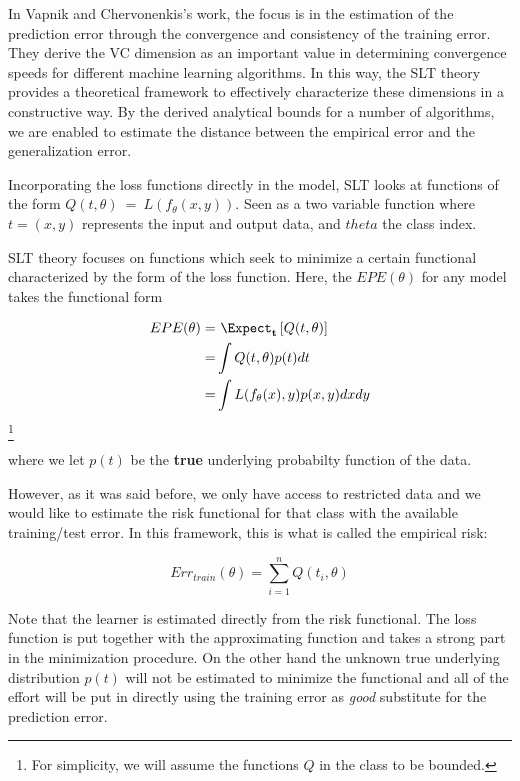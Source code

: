 In Vapnik and Chervonenkis's work, the focus is in the estimation of the prediction error through the convergence and consistency of the training error. They derive the VC dimension as an important value in determining convergence speeds for different machine learning algorithms. In this way, the SLT theory provides a theoretical framework to effectively characterize these dimensions in a constructive way. By the derived analytical bounds for a number of algorithms, we are enabled to estimate the distance between the empirical error and the generalization error.

Incorporating the loss functions directly in the model, SLT looks at functions of the form $Q(t,\theta) \ = \ L(f_\theta(x,y))$. Seen as a two variable function where $t=(x,y)$ represents the input and output data, and $theta$ the class index. 

SLT theory focuses on functions which seek to minimize a certain functional characterized by the form of the loss function. Here, the $EPE(\theta)$ for any model takes the functional form 

\begin{equation}\label{vapnik-risk}
\begin{split}
EPE(\theta) = & \ \Expect_{\textbf{t}} \left[  Q(t,\theta) \right]\\
= & \int Q(t,\theta) p(t) dt  \\
= & \int L(f_\theta(x),y) p(x,y) dx dy 
\end{split}
\end{equation}\footnote{For simplicity, we will assume the functions $Q$ in the class to be bounded.}

where we let $p(t)$ be the \textbf{true} underlying probabilty function of the data. 

However, as it was said before, we only have access to restricted data and we would like to estimate the risk functional for that class with the available training/test error. In this framework, this is what is called the empirical risk:

\begin{equation}\label{vapnik-empiricalRisk}
Err_{train}(\theta) =  \sum_{i=1}^n Q(t_i,\theta) 
\end{equation}

Note that the learner is estimated directly from the risk functional. The loss function is put together with the approximating function and takes a strong part in the minimization procedure. On the other hand the unknown true underlying distribution $p(t)$ will not be estimated to minimize the functional and all of the effort will be put in directly using the training error as \textit{good} substitute for the prediction error.


